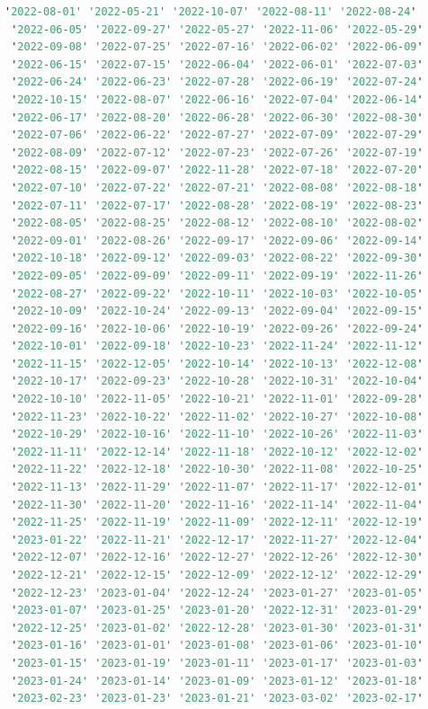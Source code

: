\begin{lstlisting}[language=haskell, caption=Valores por columna, captionpos=b, label=lst:fiboHaskell]
 '2022-08-01' '2022-05-21' '2022-10-07' '2022-08-11' '2022-08-24'
 '2022-06-05' '2022-09-27' '2022-05-27' '2022-11-06' '2022-05-29'
 '2022-09-08' '2022-07-25' '2022-07-16' '2022-06-02' '2022-06-09'
 '2022-06-15' '2022-07-15' '2022-06-04' '2022-06-01' '2022-07-03'
 '2022-06-24' '2022-06-23' '2022-07-28' '2022-06-19' '2022-07-24'
 '2022-10-15' '2022-08-07' '2022-06-16' '2022-07-04' '2022-06-14'
 '2022-06-17' '2022-08-20' '2022-06-28' '2022-06-30' '2022-08-30'
 '2022-07-06' '2022-06-22' '2022-07-27' '2022-07-09' '2022-07-29'
 '2022-08-09' '2022-07-12' '2022-07-23' '2022-07-26' '2022-07-19'
 '2022-08-15' '2022-09-07' '2022-11-28' '2022-07-18' '2022-07-20'
 '2022-07-10' '2022-07-22' '2022-07-21' '2022-08-08' '2022-08-18'
 '2022-07-11' '2022-07-17' '2022-08-28' '2022-08-19' '2022-08-23'
 '2022-08-05' '2022-08-25' '2022-08-12' '2022-08-10' '2022-08-02'
 '2022-09-01' '2022-08-26' '2022-09-17' '2022-09-06' '2022-09-14'
 '2022-10-18' '2022-09-12' '2022-09-03' '2022-08-22' '2022-09-30'
 '2022-09-05' '2022-09-09' '2022-09-11' '2022-09-19' '2022-11-26'
 '2022-08-27' '2022-09-22' '2022-10-11' '2022-10-03' '2022-10-05'
 '2022-10-09' '2022-10-24' '2022-09-13' '2022-09-04' '2022-09-15'
 '2022-09-16' '2022-10-06' '2022-10-19' '2022-09-26' '2022-09-24'
 '2022-10-01' '2022-09-18' '2022-10-23' '2022-11-24' '2022-11-12'
 '2022-11-15' '2022-12-05' '2022-10-14' '2022-10-13' '2022-12-08'
 '2022-10-17' '2022-09-23' '2022-10-28' '2022-10-31' '2022-10-04'
 '2022-10-10' '2022-11-05' '2022-10-21' '2022-11-01' '2022-09-28'
 '2022-11-23' '2022-10-22' '2022-11-02' '2022-10-27' '2022-10-08'
 '2022-10-29' '2022-10-16' '2022-11-10' '2022-10-26' '2022-11-03'
 '2022-11-11' '2022-12-14' '2022-11-18' '2022-10-12' '2022-12-02'
 '2022-11-22' '2022-12-18' '2022-10-30' '2022-11-08' '2022-10-25'
 '2022-11-13' '2022-11-29' '2022-11-07' '2022-11-17' '2022-12-01'
 '2022-11-30' '2022-11-20' '2022-11-16' '2022-11-14' '2022-11-04'
 '2022-11-25' '2022-11-19' '2022-11-09' '2022-12-11' '2022-12-19'
 '2023-01-22' '2022-11-21' '2022-12-17' '2022-11-27' '2022-12-04'
 '2022-12-07' '2022-12-16' '2022-12-27' '2022-12-26' '2022-12-30'
 '2022-12-21' '2022-12-15' '2022-12-09' '2022-12-12' '2022-12-29'
 '2022-12-23' '2023-01-04' '2022-12-24' '2023-01-27' '2023-01-05'
 '2023-01-07' '2023-01-25' '2023-01-20' '2022-12-31' '2023-01-29'
 '2022-12-25' '2023-01-02' '2022-12-28' '2023-01-30' '2023-01-31'
 '2023-01-16' '2023-01-01' '2023-01-08' '2023-01-06' '2023-01-10'
 '2023-01-15' '2023-01-19' '2023-01-11' '2023-01-17' '2023-01-03'
 '2023-01-24' '2023-01-14' '2023-01-09' '2023-01-12' '2023-01-18'
 '2023-02-23' '2023-01-23' '2023-01-21' '2023-03-02' '2023-02-17'

\end{lstlisting}
